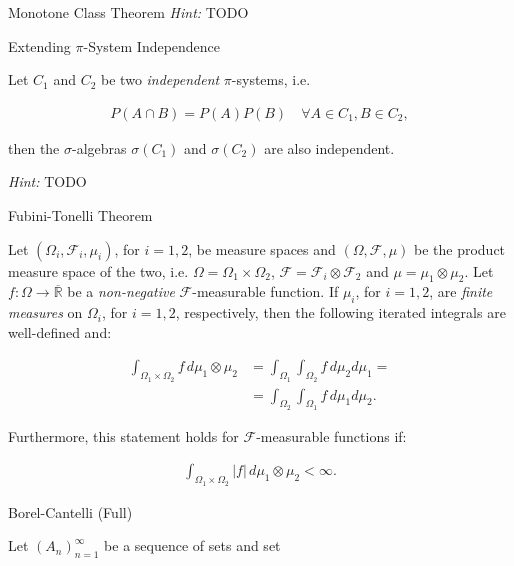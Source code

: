 \documentclass[10pt,landscape]{article}
\newcommand{\Hint}{\textit{Hint: }}
\newcommand{\SigmaAlgebra}{$\sigma$-algebra}
\newcommand{\CalF}{\mathcal{F}}
\begin{document}
\begin{multicols}{3}
\begin{theorem}{6.3}{Monotone Class Theorem}
    \Hint TODO

\end{theorem}

\begin{proposition}{6.4}{Extending $\pi$-System Independence}

    Let $C_1$ and $C_2$ be two \emph{independent} $\pi$-systems, i.e.

        \begin{align*}
            P(A \cap B) = P(A)P(B) \quad \forall A \in C_1, B \in C_2,
        \end{align*}

    then the \SigmaAlgebra s $\sigma(C_1)$ and $\sigma(C_2)$ are also independent.

    \Hint TODO

\end{proposition}

\begin{theorem}{6.7}{Fubini-Tonelli Theorem}

    Let $(\Omega_i, \CalF_i, \mu_i)$, for $i = 1,2$, be measure spaces and $(\Omega, \CalF, \mu)$ be the product measure space of the two, i.e. $\Omega = \Omega_1 \times \Omega_2$, $\CalF = \CalF_i \otimes \CalF_2$ and $\mu = \mu_1 \otimes \mu_2$. Let $f: \Omega \to \overline{\mathbb{R}}$ be a \emph{non-negative} $\CalF$-measurable function. If $\mu_i$, for $i = 1,2$, are \emph{finite measures} on $\Omega_i$, for $i = 1,2$, respectively, then the following iterated integrals are well-defined and:

        \begin{align*}
            \int_{\Omega_1 \times \Omega_2} f \, d\mu_1 \otimes \mu_2 &= \int_{\Omega_1} \int_{\Omega_2} f \, d\mu_2 d\mu_1 = \\ &= \int_{\Omega_2} \int_{\Omega_1} f \, d\mu_1 d\mu_2.
        \end{align*}

    Furthermore, this statement holds for $\CalF$-measurable functions if:

        \begin{align*}
            \int_{\Omega_1 \times \Omega_2} |f| \, d\mu_1 \otimes \mu_2 < \infty.
        \end{align*}

\end{theorem}

\begin{lemma}{6.9}{Borel-Cantelli (Full)}

    Let $(A_n)_{n=1}^{\infty}$ be a sequence of sets and set


\end{lemma}
\end{multicols}
\end{document}
